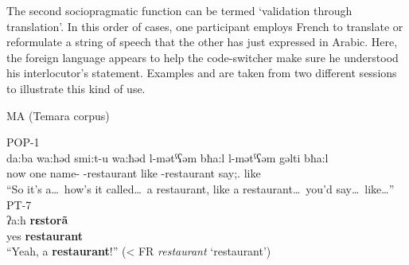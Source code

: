 \documentclass[output=paper]{langscibook}
\begin{document}
The second sociopragmatic function can be termed ‘validation through translation'. In this order of cases, one participant employs French to translate or reformulate a string of speech that the other has just expressed in Arabic. Here, the foreign language appears to help the code-switcher make sure he understood his interlocutor’s statement. Examples  and  are taken from two different sessions to illustrate this kind of use.

\begin{exe}
	\ex\label{falchetta:ex:11} \gls*{MA} (Temara corpus) \\
	\begin{xlist}
		\ex POP-1\footnotemark \\
		\gll da:ba wa:ħǝd smi:t-u {wa:ħǝd l-mǝtˁʕǝm} bħa:l l-mǝtˁʕǝm gǝlti bħa:l\\
		now one name-\Third\M\SG{} \INDF-restaurant like \DEF-restaurant say;\PFV.\Ssg{} like \\
		\glt “So it’s a\dots \ how’s it called\dots \ a restaurant, like a restaurant\dots \ you’d say\dots \ like\dots”
		\ex PT-7 \\
		\gll ʔa:h   \textbf{rɛstorã} \\
		yes \textbf{restaurant} \\
		\glt “Yeah, a \textbf{restaurant}!” (< FR \textit{restaurant} ‘restaurant’)
	\end{xlist}
\end{exe}
\end{document}
